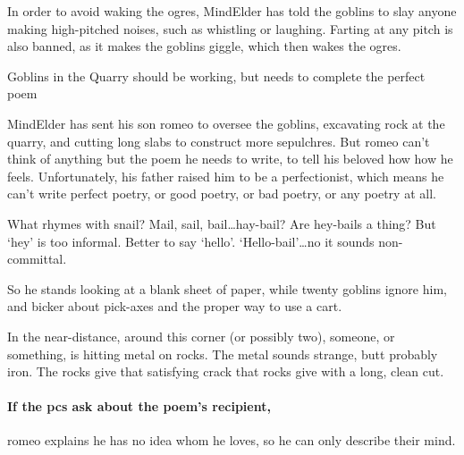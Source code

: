 \begin{multicols}{2}
In order to avoid waking the \glspl{ogre}, \gls{MindElder} has told the goblins to slay anyone making high-pitched noises, such as whistling or laughing.
Farting at any pitch is also banned, as it makes the goblins giggle, which then wakes the \glspl{ogre}.



{Goblins in the Quarry}%
{ should be working, but needs to complete the perfect poem}%
\label{goblinQuarry}

\Gls{MindElder} has sent his son \gls{romeo} to oversee the goblins, excavating rock at the quarry, and cutting long slabs to construct more sepulchres.
But \gls{romeo} can't think of anything but the poem he needs to write, to tell his beloved how how he feels.
Unfortunately, his father raised him to be a perfectionist, which means he can't write perfect poetry, or good poetry, or bad poetry, or any poetry at all.

\begin{speechtext}
  What rhymes with snail?
  Mail, sail, bail\ldots hay-bail?
  Are hey-bails a thing?
  But `hey' is too informal.
  Better to say `hello'.
  `Hello-bail'\ldots no it sounds non-committal.
\end{speechtext}

So he stands looking at a blank sheet of paper, while twenty goblins ignore him, and bicker about pick-axes and the proper way to use a cart.

\begin{boxtext}
  In the near-distance, around this corner (or possibly two), someone, or something, is hitting metal on rocks.
  The metal sounds strange, butt probably iron.
  The rocks give that satisfying crack that rocks give with a long, clean cut.
\end{boxtext}

\paragraph{If the \glspl{pc} ask about the poem's recipient,}
\gls{romeo} explains he has no idea whom he loves, so he can only describe their mind.


\end{multicols}
